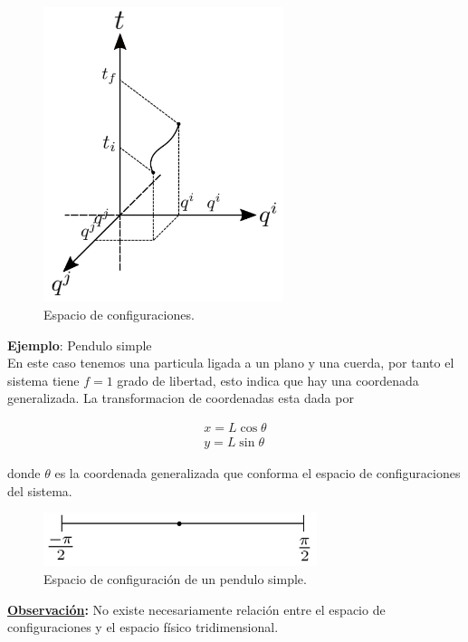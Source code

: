 \documentclass[12pt]{report}
\begin{document}
\begin{figure}
	\begin{center}
	\includegraphics[width=7cm]{figura2411.png} 
	\caption{ Espacio de configuraciones.}
	\label{fig47}
	\end{center}
\end{figure}



\textbf{Ejemplo}: Pendulo simple \\ 

En este caso tenemos una particula ligada a un plano y una cuerda, por tanto el sistema tiene $f=1$ grado de libertad, esto indica que hay una coordenada generalizada. La transformacion de coordenadas esta dada por

\begin{eqnarray}
x=L \cos{\theta} \\
y=L \sin{\theta}
\end{eqnarray}

donde $\theta$ es la coordenada generalizada que conforma el espacio de configuraciones del sistema. 

\begin{figure}[H]
	\begin{center}
	\includegraphics[width=8cm]{figura241.png} 
	\caption{ Espacio de configuración de un pendulo simple.}
	\label{fig.1}
	\end{center}
\end{figure}


\textbf{\underline{Observación}:} No existe necesariamente relación entre el espacio de configuraciones y el espacio físico tridimensional.
\end{document}

